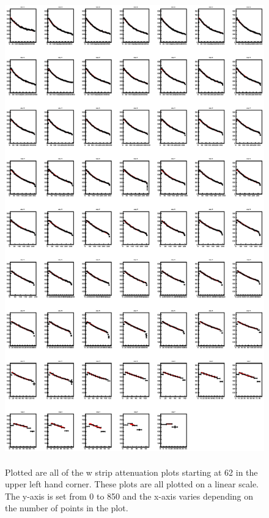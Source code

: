 \begin{figure}[h]
    \centering
    \includegraphics[width= 6.5in, height = 8in, keepaspectratio = true]{allwstrips}
    \caption{Plotted are all of the w strip attenuation plots starting at 62 in the upper left 
    hand corner. These plots are all plotted on a linear scale. The y-axis is set from 0 to 850 
    and the x-axis varies depending on the number of points in the plot.}
    \label{fig:allustrips}
\end{figure}

